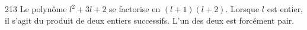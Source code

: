 
\begin{corrige}{213}
Le polynôme $l^2+3l+2$ se factorise en $(l+1)(l+2)$. Lorsque $l$ est entier, il s'agit du produit de deux entiers successifs. L'un des deux est forcément pair.
\end{corrige}

